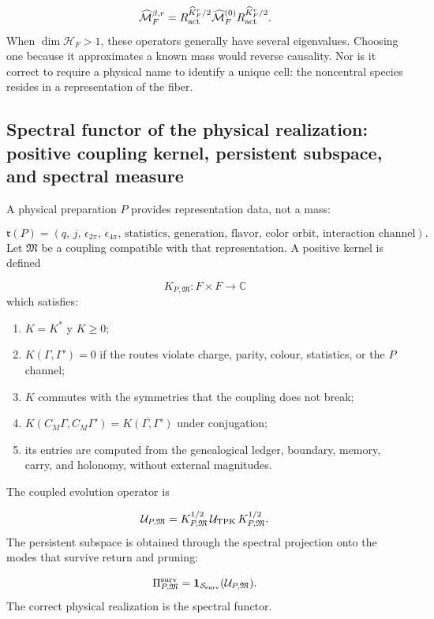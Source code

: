 \[
 \widehat{\mathcal M}_F^{\beta,r}
 =R_{\rm act}^{\widehat K_F^r/2}
  \widehat{\mathcal M}_F^{(0)}
  R_{\rm act}^{\widehat K_F^r/2}.
\]
When \(\dim\mathcal H_F>1\), these operators generally have several eigenvalues. Choosing one because it approximates a known mass would reverse causality. Nor is it correct to require a physical name to identify a unique cell: the noncentral species resides in a representation of the fiber.

\subsection{Spectral functor of the physical realization: positive coupling kernel, persistent subspace, and spectral measure}
A physical preparation \(P\) provides representation data, not a mass:

\[
 \mathfrak r(P)=
 (q,\,j,\,\epsilon_{2\pi},\,\epsilon_{4\pi},\,
  \text{statistics},\,\text{generation},\,\text{flavor},\,
  \text{color orbit},\,\text{interaction channel}).
\]
Let \(\mathfrak M\) be a coupling compatible with that representation. A positive kernel is defined

\[
 K_{P,\mathfrak M}:F\times F\longrightarrow\mathbb C
\]
which satisfies:

\begin{enumerate}
\item \(K=K^*\) y \(K\ge0\);
\item \(K(\Gamma,\Gamma')=0\) if the routes violate charge, parity, colour, statistics, or the
\(P\) channel;

\item \(K\) commutes with the symmetries that the coupling does not break;
\item \(K(C_M\Gamma,C_M\Gamma')=\overline{K(\Gamma,\Gamma')}\) under conjugation;
\item its entries are computed from the genealogical ledger, boundary, memory, carry, and holonomy, without
external magnitudes.

\end{enumerate}
The coupled evolution operator is

\[
 \mathcal U_{P,\mathfrak M}
 =K_{P,\mathfrak M}^{1/2}\,\mathcal U_{\rm TPK}\,
  K_{P,\mathfrak M}^{1/2}.
\]
The persistent subspace is obtained through the spectral projection onto the modes that survive return and pruning:

\[
 \Pi_{P,\mathfrak M}^{\rm surv}
 =\mathbf1_{\mathcal S_{\rm surv}}(\mathcal U_{P,\mathfrak M}).
\]
The correct physical realization is the spectral functor.

